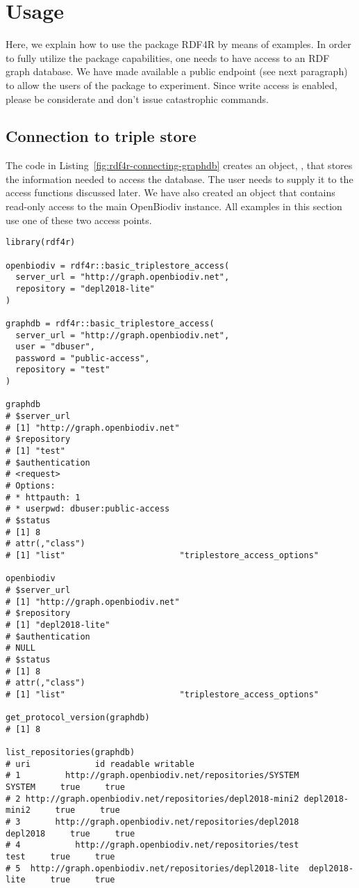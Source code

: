 \section{Usage}

Here, we explain how to use the package RDF4R by means of examples. In order to fully utilize the package capabilities, one needs to have access to an RDF graph database. We have made available a public endpoint (see next paragraph) to allow the users of the package to experiment. Since write access is enabled, please be considerate and don't issue catastrophic commands.

\subsection{Connection to triple store}

The code in Listing~\ref{fig:rdf4r-connecting-graphdb} creates an object, , that stores the information needed to access the database. The user needs to supply it to the access functions discussed later. We have also created an object  that contains read-only access to the main OpenBiodiv instance. All examples in this section use one of these two access points.

\begin{lstlisting}[language=SPARQL,
caption=R code: connecting to an RDF database using RDF4R. Outputs are given as comments after the statements.,
label=fig:rdf4r-connecting-graphdb,
basicstyle=\ttfamily\tiny]
library(rdf4r)

openbiodiv = rdf4r::basic_triplestore_access(
  server_url = "http://graph.openbiodiv.net",
  repository = "depl2018-lite"
)

graphdb = rdf4r::basic_triplestore_access(
  server_url = "http://graph.openbiodiv.net",
  user = "dbuser",
  password = "public-access",
  repository = "test"
)

graphdb
# $server_url
# [1] "http://graph.openbiodiv.net"
# $repository
# [1] "test"
# $authentication
# <request>
# Options:
# * httpauth: 1
# * userpwd: dbuser:public-access
# $status
# [1] 8
# attr(,"class")
# [1] "list"                       "triplestore_access_options"

openbiodiv
# $server_url
# [1] "http://graph.openbiodiv.net"
# $repository
# [1] "depl2018-lite"
# $authentication
# NULL
# $status
# [1] 8
# attr(,"class")
# [1] "list"                       "triplestore_access_options"

get_protocol_version(graphdb)
# [1] 8

list_repositories(graphdb)
# uri             id readable writable
# 1         http://graph.openbiodiv.net/repositories/SYSTEM         SYSTEM     true     true
# 2 http://graph.openbiodiv.net/repositories/depl2018-mini2 depl2018-mini2     true     true
# 3       http://graph.openbiodiv.net/repositories/depl2018       depl2018     true     true
# 4           http://graph.openbiodiv.net/repositories/test           test     true     true
# 5  http://graph.openbiodiv.net/repositories/depl2018-lite  depl2018-lite     true     true
\end{lstlisting}

